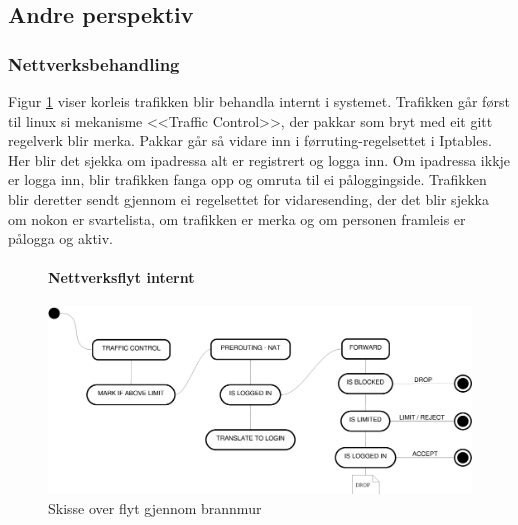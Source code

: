 \documentclass[nynorsk,12pt,a4paper]{article}
\begin{document}
\newpage
\subsection{Andre perspektiv}
\subsubsection{Nettverksbehandling}
Figur \ref{fig:iptables} viser korleis trafikken blir behandla internt i systemet. Trafikken går først til linux si mekanisme <<Traffic Control>>, der pakkar som bryt med eit gitt regelverk blir merka. Pakkar går så vidare inn i førruting-regelsettet i Iptables. Her blir det sjekka om ipadressa alt er registrert og logga inn. Om ipadressa ikkje er logga inn, blir trafikken fanga opp og omruta til ei påloggingside.
Trafikken blir deretter sendt gjennom ei regelsettet for vidaresending, der det blir sjekka om nokon er svartelista, om trafikken er merka og om personen framleis er pålogga og aktiv. 
\begin{figure}[h!]
\paragraph{Nettverksflyt internt}
	\centering
	\includegraphics[scale=0.45]{imgs/iptables.eps}
	\caption{Skisse over flyt gjennom brannmur}
	\label{fig:iptables}
\end{figure}
\newpage
\end{document}
